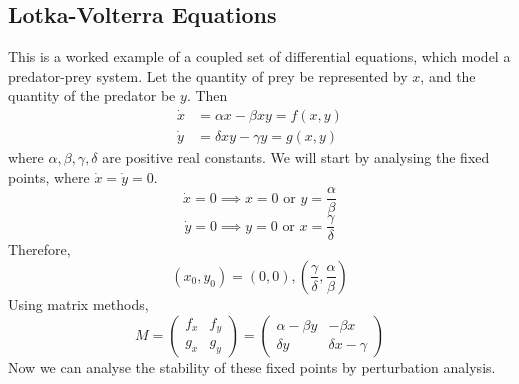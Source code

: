 \subsection{Lotka-Volterra Equations}
This is a worked example of a coupled set of differential equations, which model a predator-prey system.
Let the quantity of prey be represented by \(x\), and the quantity of the predator be \(y\).
Then
\begin{align*}
	\dot x & = \alpha x - \beta xy = f(x, y) \\
	\dot y & = \delta xy - \gamma y = g(x,y)
\end{align*}
where \(\alpha, \beta, \gamma, \delta\) are positive real constants.
We will start by analysing the fixed points, where \(\dot x = \dot y = 0\).
\[
	\dot x = 0 \implies x=0 \text{ or } y = \frac{\alpha}{\beta}
\]
\[
	\dot y = 0 \implies y=0 \text{ or } x = \frac{\gamma}{\delta}
\]
Therefore,
\[
	(x_0, y_0) = (0, 0), \left( \frac{\gamma}{\delta}, \frac{\alpha}{\beta} \right)
\]
Using matrix methods,
\[
	M = \begin{pmatrix}
		f_x & f_y \\
		g_x & g_y
	\end{pmatrix} = \begin{pmatrix}
		\alpha - \beta y & -\beta x          \\
		\delta y         & \delta x - \gamma
	\end{pmatrix}
\]
Now we can analyse the stability of these fixed points by perturbation analysis.
